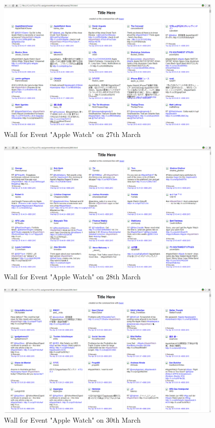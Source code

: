 \documentclass[12pt]{Report}
\begin{document}
\begin{figure}[ht]    
    \begin{center}
        \includegraphics[scale=0.60]{wall27th.png}
        \caption{Wall for Event "Apple Watch" on 27th March }
        \label{Wall for Event "Apple Watch" on 27th March}
    \end{center}
\end{figure}



\begin{figure}[ht]    
    \begin{center}
        \includegraphics[scale=0.60]{wall28th.png}
        \caption{Wall for Event "Apple Watch" on 28th March }
        \label{Wall for Event "Apple Watch" on 28th March}
    \end{center}
\end{figure}



\begin{figure}[ht]    
    \begin{center}
        \includegraphics[scale=0.60]{wall30th.png}
        \caption{Wall for Event "Apple Watch" on 30th March }
        \label{Wall for Event "Apple Watch" on 30th March}
    \end{center}
\end{figure}
\end{document}
